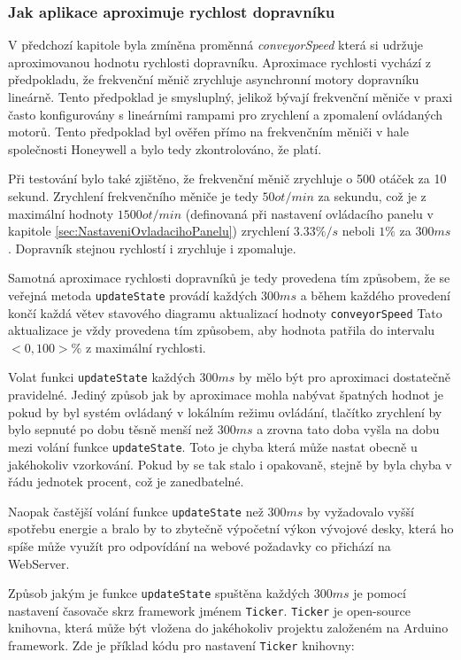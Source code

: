 \subsubsection{Jak aplikace aproximuje rychlost dopravníku}\label{sec:AproximaceRychlostiDopravniku}
V předchozí kapitole byla zmíněna proměnná \textit{conveyorSpeed} která si udržuje aproximovanou hodnotu rychlosti dopravníku. Aproximace rychlosti vychází z předpokladu, že frekvenční měnič zrychluje asynchronní motory dopravníku lineárně. Tento předpoklad je smysluplný, jelikož bývají frekvenční měniče v praxi často konfigurovány s lineárními rampami pro zrychlení a zpomalení ovládaných motorů. Tento předpoklad byl ověřen přímo na frekvenčním měniči v hale společnosti Honeywell a bylo tedy zkontrolováno, že platí.

Při testování bylo také zjištěno, že frekvenční měnič zrychluje o 500 otáček za 10 sekund. Zrychlení frekvenčního měniče je tedy $50ot/min$ za sekundu, což je z maximální hodnoty $1500ot/min$ (definovaná při nastavení ovládacího panelu v kapitole \ref{sec:NastaveniOvladacihoPanelu}) zrychlení $3.33\%/s$ neboli $1\%$ za $300ms$. Dopravník stejnou rychlostí i zrychluje i zpomaluje.

Samotná aproximace rychlosti dopravníků je tedy provedena tím způsobem, že se veřejná metoda \texttt{updateState} provádí každých $300ms$ a během každého provedení končí každá větev stavového diagramu aktualizací hodnoty \texttt{conveyorSpeed} Tato aktualizace je vždy provedena tím způsobem, aby hodnota patřila do intervalu $<0,100>\%$ z maximální rychlosti.

Volat funkci \texttt{updateState} každých $300ms$ by mělo být pro aproximaci dostatečně pravidelné. Jediný způsob jak by aproximace mohla nabývat špatných hodnot je pokud by byl systém ovládaný v lokálním režimu ovládání, tlačítko zrychlení by bylo sepnuté po dobu těsně menší než $300ms$ a zrovna tato doba vyšla na dobu mezi volání funkce \texttt{updateState}. Toto je chyba která může nastat obecně u jakéhokoliv vzorkování. Pokud by se tak stalo i opakovaně, stejně by byla chyba v řádu jednotek procent, což je zanedbatelné.

Naopak častější volání funkce \texttt{updateState} než $300ms$ by vyžadovalo vyšší spotřebu energie a bralo by to zbytečně výpočetní výkon vývojové desky, která ho spíše může využít pro odpovídání na webové požadavky co přichází na WebServer.

Způsob jakým je funkce \texttt{updateState} spuštěna každých $300ms$ je pomocí nastavení časovače skrz framework jménem \texttt{Ticker}. \texttt{Ticker} je open-source knihovna, která může být vložena do jakéhokoliv projektu založeném na Arduino framework. Zde je příklad kódu pro nastavení \texttt{Ticker} knihovny:

